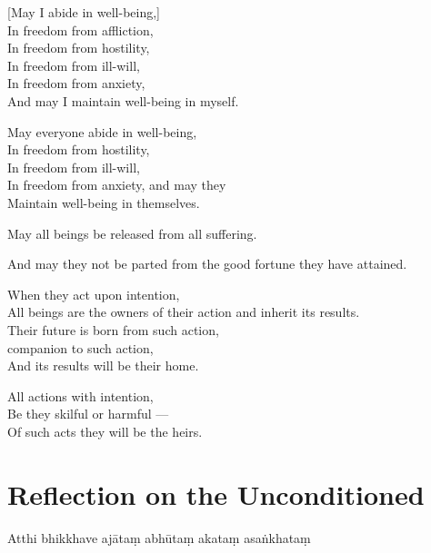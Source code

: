 \begin{leader}
\end{leader}


[May I abide in well-being,]\\
In freedom from affliction,\\
In freedom from hostility,\\
In freedom from ill-will,\\
In freedom from anxiety,\\
And may I maintain well-being in myself.

May everyone abide in well-being,\\
In freedom from hostility,\\
In freedom from ill-will,\\
In freedom from anxiety, and may they\\
Maintain well-being in themselves.

May all beings be released from all suffering.

And may they not be parted from the good fortune they have attained.

When they act upon intention,\\
All beings are the owners of their action and inherit its results.\\
Their future is born from such action,\\
companion to such action,\\
And its results will be their home.

All actions with intention,\\
Be they skilful or harmful ---\\
Of such acts they will be the heirs.


\section[The Unconditioned]{Reflection on the Unconditioned}

\begin{leader}
\end{leader}


Atthi bhikkhave ajātaṃ abhūtaṃ akataṃ asaṅkhataṃ

